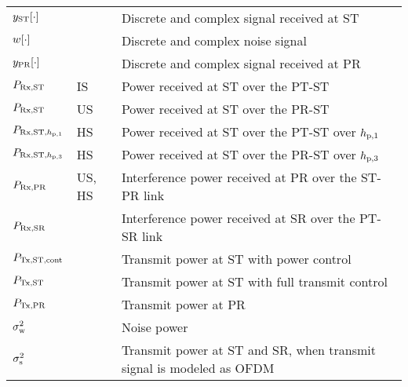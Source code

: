 \begin{longtable}{p{}p{}p{}}
	$y_{\text{ST}}[\cdot]$       & &             Discrete and complex signal received at ST \\	
	
	$w[\cdot]$       & &             Discrete and complex noise signal \\	

	$y_{\text{PR}}[\cdot]$       & &             Discrete and complex signal received at PR \\	
	$P_{\text{Rx,ST}}$  		& IS &		Power received at ST over the PT-ST \\ 
	$P_{\text{Rx,ST}}$  		& US &		Power received at ST over the PR-ST \\ 
	$P_{\text{Rx,ST,$h_{\text{p,1}}$}}$  		& HS &		Power received at ST over the PT-ST over $h_{\text{p,1}}$ \\ 
	$P_{\text{Rx,ST,$h_{\text{p,3}}$}}$  		& HS &		Power received at ST over the PR-ST over $h_{\text{p,3}}$ \\ 
	$P_{\text{Rx,PR}}$  		& US, HS &		Interference power received at PR over the ST-PR link \\
	$P_{\text{Rx,SR}}$  		& &		Interference power received at SR over the PT-SR link\\ 

	$P_{\text{Tx,ST,cont}}$	  		& &  	Transmit power at ST with power control \\
	$P_{\text{Tx,ST}}$ 		& &  	Transmit power at ST with full transmit control \\
	$P_{\text{Tx,PR}}$  		& &		Transmit power at PR \\

	$\sigma^2_{\text{w}}$	 		& & 	Noise power \\
	$\sigma^2_{\text{s}}$	 		& &  Transmit power at ST and SR, when transmit signal is modeled as OFDM  \\


\end{longtable}
